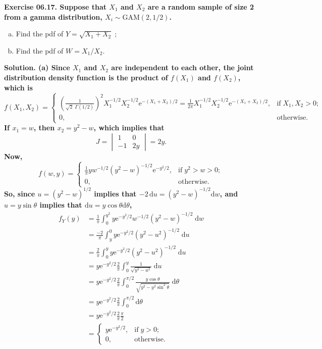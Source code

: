 \newcommand{\me}{\mathrm{e}}
\newcommand{\md}{\mathrm{d}}
\par{}
\vspace{1cm}

  \bf{Exercise 06.17.} Suppose that $X_1$ and $X_2$ are a random sample of size 2 from a gamma distribution, $X_i\sim\mathrm{GAM}(2,1/2)$.
    \begin{enumerate}[(a)]
      \item
        Find the pdf of $Y=\sqrt{X_1+X_2}\;;$
      \item
        Find the pdf of $W={X_1}/{X_2}$.
    \end{enumerate}


\bf{Solution.}
  (a) Since $X_1$ and $X_2$ are independent to each other,
  the joint distribution density function is the product of $f(X_1)$ and $f(X_2)$, which is
    $$
      f(X_1,X_2)=
        \begin{cases}
          \left(\frac{1}{\sqrt{2}\;\Gamma(1/2)}\right)^2X_1^{-1/2}X_2^{-1/2}\me^{-(X_1+X_2)\!/2}
          =\frac{1}{2\pi}X_1^{-1/2}X_2^{-1/2}\me^{-(X_1+X_2)/2}, & \mathrm{if}\;X_1,X_2>0; \\
          0, & \mathrm{otherwise}.
        \end{cases}
    $$
  If $x_1=w$, then $x_2=y^2-w$, which implies that
    $$
      J=
        \begin{vmatrix}
          1 & 0 \\
          -1 & 2y
        \end{vmatrix}
      =2y.
    $$
  Now,
    $$
      f(w,y)=
        \begin{cases}
          \frac{1}{\pi}yw^{-1/2}(y^2-w)^{-1/2}\me^{-y^2/2}, & \mathrm{if}\;y^2>w>0; \\
          0, & \mathrm{otherwise}.
        \end{cases}
    $$
  So, since $u=(y^2-w)^{1/2}$ implies that $-2\,\md u=(y^2-w)^{-1/2}\md w$, and $u=y\sin\theta$ implies that $\md u=y\cos\theta \md \theta$,
    \begin{align*}
      f_Y(y)&=\frac{1}{\pi}\int_0^{y^2}y\me^{-y^2/2}w^{-1/2}(y^2-w)^{-1/2}\;\md w \\
      &=\frac{-2}{\pi}\int_y^0y\me^{-y^2/2}(y^2-u^2)^{-1/2}\;\md u \\
      &=\frac{2}{\pi}\int_0^yy\me^{-y^2/2}(y^2-u^2)^{-1/2}\;\md u \\ &=y\me^{-y^2/2}\frac{2}{\pi}\int_0^y\frac{1}{\sqrt{y^2-u^2}}\;\md u\\
      &=y\me^{-y^2/2}\frac{2}{\pi}\int_0^{\pi/2}\frac{y\cos\theta}{\sqrt{y^2-y^2\sin^2\theta}}\;\md \theta\\
      &=y\me^{-y^2/2}\frac{2}{\pi}\int_0^{\pi/2}\md \theta\\
      &=y\me^{-y^2/2}\frac{2}{\pi}\frac{\pi}{2}\\
      &=\begin{cases}
         y\me^{-y^2/2}, & \mathrm{if}\;y>0; \\
          0, & \mathrm{otherwise}.
        \end{cases}
    \end{align*}

